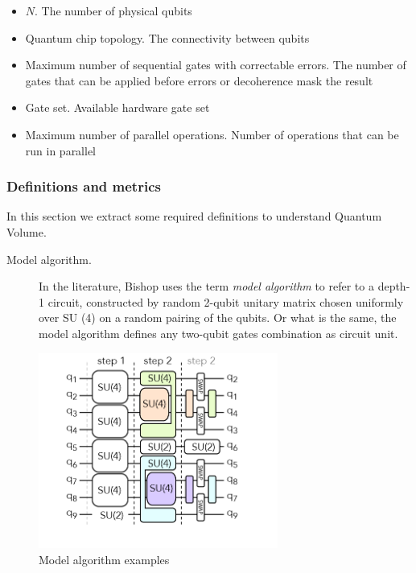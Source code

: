 \documentclass[11pt]{article}
\begin{document}
\begin{itemize}
\item \(N\). The number of physical qubits
\item Quantum chip topology. The connectivity between qubits
\item Maximum number of sequential gates with correctable errors. The number of gates that can be applied before errors or decoherence mask the result
\item Gate set. Available hardware gate set
\item Maximum number of parallel operations. Number of operations that can be run in parallel
\end{itemize}

\subsubsection{Definitions and metrics}
\label{sec:orgb5e898e}

In this section we extract some required definitions \cite{Bishop_2017,Moll_2018} to understand Quantum Volume.


\begin{description}
\item[{Model algorithm.}] In the literature, Bishop uses the term \emph{model algorithm} \cite{Bishop_2017} to refer to a depth-1 circuit, constructed by random 2-qubit unitary matrix chosen uniformly over SU (4) on a random pairing of the qubits. Or what is the same, the model algorithm defines any two-qubit gates combination as circuit unit.
\end{description}

\begin{figure}[htbp]
\centering
\includegraphics[width=0.7\textwidth]{model_algorithm.png}
\caption{\label{fig:orge3010ce}
Model algorithm examples}
\end{figure}
\end{document}
